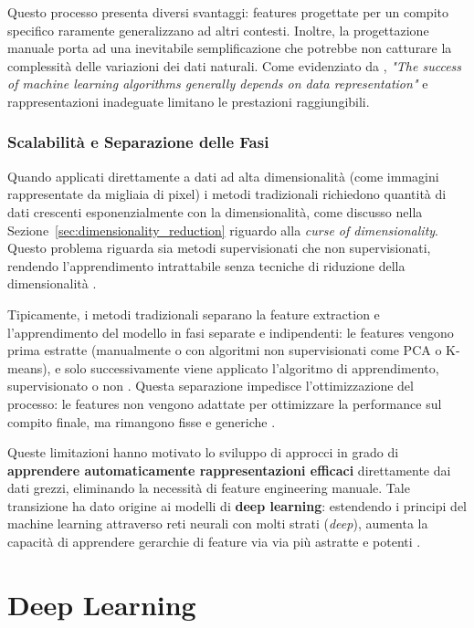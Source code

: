 Questo processo presenta diversi svantaggi: features progettate per un compito specifico raramente generalizzano ad altri contesti. Inoltre, la progettazione manuale porta ad una inevitabile semplificazione che potrebbe non catturare la complessità delle variazioni dei dati naturali. Come evidenziato da \cite{bengio2013representation}, \textit{"The success of machine learning algorithms generally depends on
data representation"} e rappresentazioni inadeguate limitano le prestazioni raggiungibili.

\subsubsection{Scalabilità e Separazione delle Fasi}
Quando applicati direttamente a dati ad alta dimensionalità (come immagini rappresentate da migliaia di pixel) i metodi tradizionali richiedono quantità di dati crescenti esponenzialmente con la dimensionalità, come discusso nella Sezione~\ref{sec:dimensionality_reduction} riguardo alla \textit{curse 
of dimensionality}. Questo problema riguarda sia metodi supervisionati che non supervisionati, rendendo l'apprendimento intrattabile senza  tecniche di riduzione della dimensionalità \cite{hastie2009elements}.

Tipicamente, i metodi tradizionali separano la feature extraction e l'ap\-pren\-di\-men\-to del modello in fasi separate e indipendenti: le features vengono prima estratte (manualmente o con algoritmi non supervisionati come PCA o K-means), e solo successivamente viene applicato l'algoritmo di apprendimento, supervisionato o non \cite{lecun2015deep}. Questa separazione impedisce l'ottimizzazione del processo: le features non vengono adattate per ottimizzare la performance sul compito finale, ma rimangono fisse e generiche \cite{bengio2013representation}.

Queste limitazioni hanno motivato lo sviluppo di approcci in grado di \textbf{apprendere automaticamente rappresentazioni efficaci} direttamente dai dati grezzi, eliminando la necessità di feature engineering manuale. Tale transizione ha dato origine ai modelli di \textbf{deep learning}: estendendo i principi del machine learning attraverso reti neurali con molti strati (\textit{deep}), aumenta la capacità di apprendere gerarchie di feature via via più astratte e potenti \cite{goodfellow2016deep}.


\section{Deep Learning}

